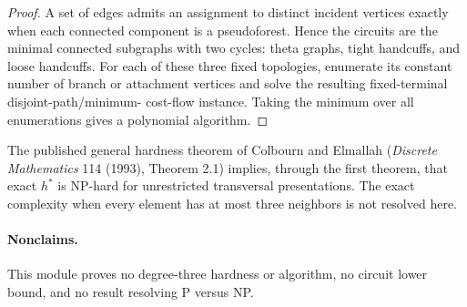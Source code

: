 \documentclass[11pt]{article}
\begin{document}
\begin{proof}
A set of edges admits an assignment to distinct incident vertices
exactly when each connected component is a pseudoforest. Hence the
circuits are the minimal connected subgraphs with two cycles: theta
graphs, tight handcuffs, and loose handcuffs. For each of these three
fixed topologies, enumerate its constant number of branch or attachment
vertices and solve the resulting fixed-terminal disjoint-path/minimum-
cost-flow instance. Taking the minimum over all enumerations gives a
polynomial algorithm.
\end{proof}

The published general hardness theorem of Colbourn and Elmallah
(\emph{Discrete Mathematics} 114 (1993), Theorem 2.1) implies, through
the first theorem, that exact \(h^*\) is NP-hard for unrestricted
transversal presentations. The exact complexity when every element
has at most three neighbors is not resolved here.

\paragraph{Nonclaims.}
This module proves no degree-three hardness or algorithm, no circuit
lower bound, and no result resolving P versus NP.
\end{document}
